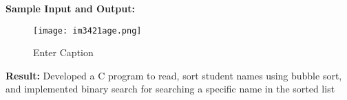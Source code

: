 \documentclass{article}
\begin{document}
\textbf{Sample Input and Output:}
\begin{figure}
    \centering
    \texttt{[image: im3421age.png]}
    \caption{Enter Caption}
    \label{fig:enter-label}
\end{figure}

\textbf{Result:} Developed a C program to read, sort student names using bubble sort, and implemented binary search for searching a specific name in the sorted list
\end{document}
